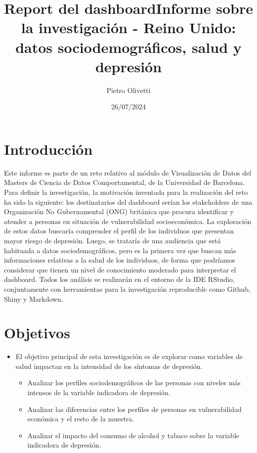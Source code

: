 \documentclass{report}
\title{Report del dashboard}
\date{26/07/2024}
\author{Pietro Olivetti}
\begin{document}


\title{Informe sobre la investigación - Reino Unido: datos sociodemográficos, salud y depresión}

\maketitle





\section{Introducción}

Este informe es parte de un reto relativo al módulo de Visualización de Datos del Masters de Ciencia de Datos Comportamental, de la Universidad de Barcelona. Para definir la investigación, la motivación inventada para la realización del reto ha sido la siguiente: los destinatarios del dashboard serían los stakeholders de una Organización No Gubernamental 
(ONG) británica que procura identificar y atender a personas en situación de vulnerabilidad 
socioeconómica. La exploración de estos datos buscaría comprender el perfil de los individuos que 
presentan mayor riesgo de depresión.  Luego, se trataría de una audiencia que está habituada a datos 
sociodemográficos, pero es la primera vez que buscan más informaciones relativas a la salud de 
los individuos, de forma que podríamos considerar que tienen un nivel de conocimiento 
moderado para interpretar el dashboard. Todos los análisis se realizarán en el entorno de la IDE 
RStudio, conjuntamente con herramientas para la investigación reproducible como  Github, 
Shiny y Markdown. 

\section{Objetivos}

\begin{itemize}
\item El objetivo principal de esta investigación es de explorar como variables de salud impactan en la intensidad de los síntomas de depresión.
\begin{itemize}
\item	Analizar los perfiles sociodemográficos de las personas con niveles más intensos de la variable indicadora de depresión. 
\item	Analizar las diferencias entre los perfiles de personas en vulnerabilidad económica y el resto de la muestra. 
\item	Analizar el impacto del consumo de alcohol y tabaco sobre la variable indicadora de depresión.
\end{itemize}
\end{itemize}
\end{document}
